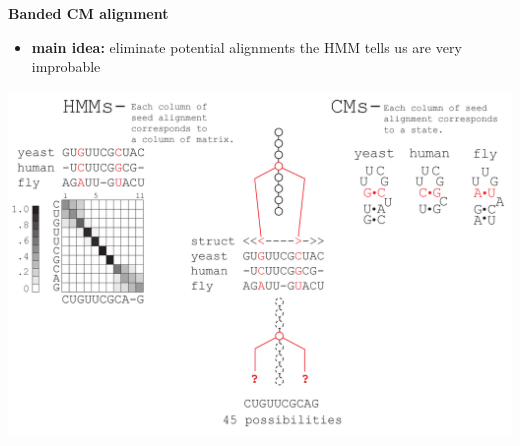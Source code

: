 \documentclass[landscape]{slides}
\begin{document}
\begin{slide}
\begin{center}
\large
\textbf{Banded CM alignment}
\end{center}
\medskip
\small
\begin{itemize}
\item
\textbf{main idea:} eliminate potential alignments the HMM tells us are very improbable
\end{itemize}
\begin{center}
\includegraphics[width=8in]{figs/post_hmm_to_cm_map2_layer14}
\end{center}
\vfill
\end{slide}
\end{document}
